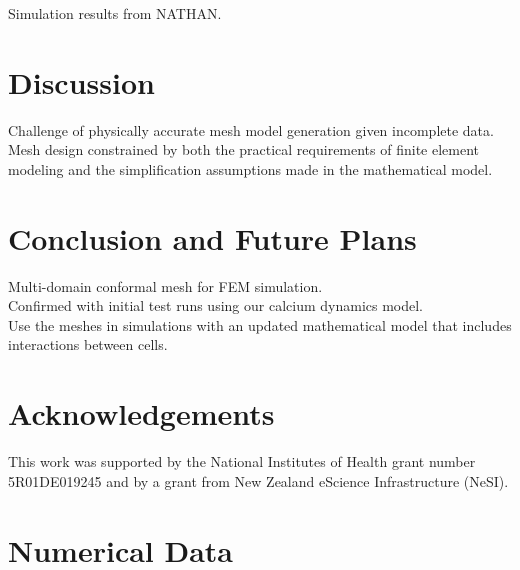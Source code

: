 \documentclass[a4paper,10pt]{article}
\begin{document}
Simulation results from NATHAN.\\

\section{Discussion}

Challenge of physically accurate mesh model generation given incomplete data.\\
Mesh design constrained by both the practical requirements of finite element modeling and the simplification assumptions made in the mathematical model.\\ 

\section{Conclusion and Future Plans}

Multi-domain conformal mesh for FEM simulation.\\
Confirmed with initial test runs using our calcium dynamics model.\\
Use the meshes in simulations with an updated mathematical model that includes interactions between cells.\\


\section{Acknowledgements}
This work was supported by the National Institutes of Health grant number 5R01DE019245 and by a grant from New Zealand eScience Infrastructure (NeSI).\\




\pagebreak
\appendix

\section{Numerical Data}
\end{document}
